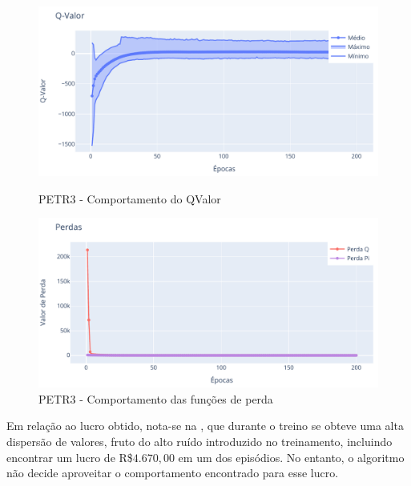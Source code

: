\begin{figure}[htbp]
    \centering 
    \begin{minipage}[b]{0.45\linewidth}
        \includegraphics[width=\linewidth]{img/ddpg/petr3/clean/qval}
        \caption{PETR3 - Comportamento do QValor} 
        \label{ptr_clean_qval}
    \end{minipage}
    \quad
    \begin{minipage}[b]{0.45\linewidth}
        \includegraphics[width=\linewidth]{img/ddpg/petr3/clean/loss}
        \caption{PETR3 - Comportamento das funções de perda}
        \label{petr_clean_loss}
    \end{minipage}
\end{figure}

Em relação ao lucro obtido, nota-se na , que durante o treino se obteve uma alta dispersão de valores, fruto do alto ruído introduzido no treinamento, incluindo encontrar um lucro de R\$$4.670,00$ em um dos episódios. No entanto, o algoritmo não decide aproveitar o comportamento encontrado para esse lucro. 


